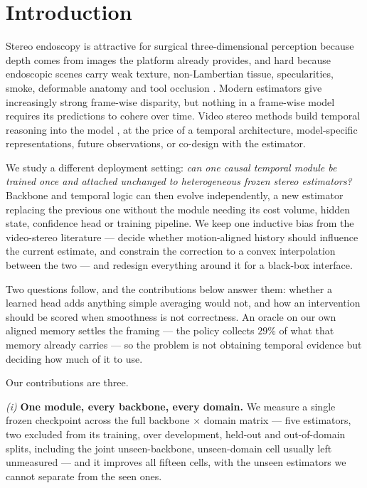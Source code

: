 \documentclass[letterpaper,10pt,conference]{ieeeconf}
\begin{document}
\section{Introduction}
\label{sec:intro}

Stereo endoscopy is attractive for surgical three-dimensional perception
because depth comes from images the platform already provides, and hard
because endoscopic scenes carry weak texture, non-Lambertian tissue,
specularities, smoke, deformable anatomy and tool occlusion
\cite{allan2021scared,edwards2022servct}. Modern estimators
\cite{lipson2021raftstereo,li2022crestereo,bartolomei2025stereoanywhere,min2025s2m2,wen2026fastfoundationstereo}
give increasingly strong frame-wise disparity, but nothing in a frame-wise
model requires its predictions to cohere over time. Video stereo methods build
temporal reasoning into the model
\cite{karaev2023dynamicstereo,li2023codd,jing2024bida,wang2025ppm}, at the
price of a temporal architecture, model-specific representations, future
observations, or co-design with the estimator.

We study a different deployment setting: \emph{can one causal temporal module
be trained once and attached unchanged to heterogeneous frozen stereo
estimators?} Backbone and temporal logic can then evolve independently, a new
estimator replacing the previous one without the module needing its cost
volume, hidden state, confidence head or training pipeline. We keep one
inductive bias from the video-stereo literature --- decide whether
motion-aligned history should influence the current estimate, and constrain
the correction to a convex interpolation between the two --- and redesign
everything around it for a black-box interface.

Two questions follow, and the contributions below answer them: whether a
learned head adds anything simple averaging would not, and how an intervention
should be scored when smoothness is not correctness. An oracle on our own
aligned memory settles the framing --- the policy collects $29\%$ of what that
memory already carries --- so the problem is not obtaining temporal evidence
but deciding how much of it to use.

Our contributions are three.

\emph{(i)} \textbf{One module, every backbone, every domain.} We measure a
single frozen checkpoint across the full backbone $\times$ domain matrix ---
five estimators, two excluded from its training, over development, held-out
and out-of-domain splits, including the joint unseen-backbone, unseen-domain
cell usually left unmeasured --- and it improves all fifteen cells, with the
unseen estimators we cannot separate from the seen ones.
\end{document}
